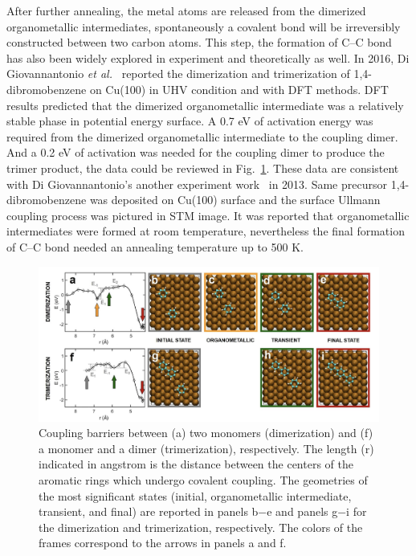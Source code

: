 \documentclass[%
 reprint,
 amsmath,amssymb,
 aps,
prb,
]{revtex4-2}
\begin{document}
After further annealing, the metal atoms are released from the dimerized organometallic intermediates, spontaneously a covalent bond will be irreversibly constructed between two carbon atoms. This step, the formation of C--C bond has also been widely explored in experiment and theoretically as well. In 2016, Di Giovannantonio \textit{et al.}~\cite{jacs2016} reported the dimerization and trimerization of 1,4-dibromobenzene on Cu(100) in UHV condition and with DFT methods. DFT results predicted that the dimerized organometallic intermediate was a relatively stable phase in potential energy surface. A 0.7 eV of activation energy was required from the dimerized organometallic intermediate to the coupling dimer. And a 0.2 eV of activation was needed for the coupling dimer to produce the trimer product, the data could be reviewed in Fig.~\ref{fig:dimer}. These data are consistent with Di Giovannantonio's another experiment work~\cite{acsnano2013} in 2013. Same precursor 1,4-dibromobenzene was deposited on Cu(100) surface and the surface Ullmann coupling process was pictured in STM image. It was reported that organometallic intermediates were formed at room temperature, nevertheless the final formation of C--C bond needed an annealing temperature up to 500 K.
%
\begin{figure}[ht]
\centering
\includegraphics[width=1.0\textwidth]{Fig/Dimer_trimer.png}
\caption{Coupling barriers between (a) two monomers (dimerization) and (f) a monomer and a dimer (trimerization), respectively. The length (r) indicated in angstrom is the distance between the centers of the aromatic rings which undergo covalent coupling. The geometries of the most significant states (initial, organometallic intermediate, transient, and final) are reported in panels b−e and panels g−i for the dimerization and trimerization, respectively. The colors of the frames correspond to the arrows in panels a and f.}
\label{fig:dimer}
\end{figure}
%
\end{document}
